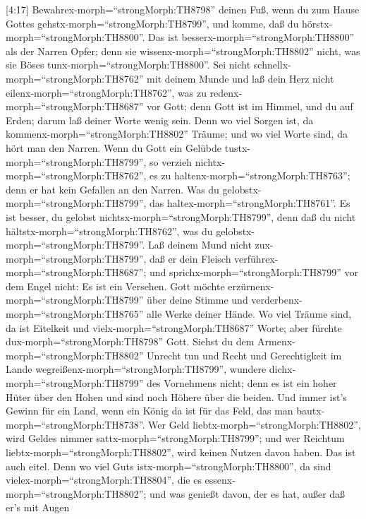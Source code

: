  {[}4:17{]} Bewahrex-morph=``strongMorph:TH8798'' deinen
Fuß, wenn du zum Hause Gottes gehstx-morph=``strongMorph:TH8799'', und
komme, daß du hörstx-morph=``strongMorph:TH8800''. Das ist
besserx-morph=``strongMorph:TH8800'' als der Narren Opfer; denn sie
wissenx-morph=``strongMorph:TH8802'' nicht, was sie Böses
tunx-morph=``strongMorph:TH8800''.  Sei nicht
schnellx-morph=``strongMorph:TH8762'' mit deinem Munde und laß dein Herz
nicht eilenx-morph=``strongMorph:TH8762'', was zu
redenx-morph=``strongMorph:TH8687'' vor Gott; denn Gott ist im Himmel,
und du auf Erden; darum laß deiner Worte wenig sein.  Denn
wo viel Sorgen ist, da kommenx-morph=``strongMorph:TH8802'' Träume; und
wo viel Worte sind, da hört man den Narren.  Wenn du Gott
ein Gelübde tustx-morph=``strongMorph:TH8799'', so verzieh
nichtx-morph=``strongMorph:TH8762'', es zu
haltenx-morph=``strongMorph:TH8763''; denn er hat kein Gefallen an den
Narren. Was du gelobstx-morph=``strongMorph:TH8799'', das
haltex-morph=``strongMorph:TH8761''.  Es ist besser, du
gelobst nichtsx-morph=``strongMorph:TH8799'', denn daß du nicht
hältstx-morph=``strongMorph:TH8762'', was du
gelobstx-morph=``strongMorph:TH8799''.  Laß deinem Mund
nicht zux-morph=``strongMorph:TH8799'', daß er dein Fleisch
verführex-morph=``strongMorph:TH8687''; und
sprichx-morph=``strongMorph:TH8799'' vor dem Engel nicht: Es ist ein
Versehen. Gott möchte erzürnenx-morph=``strongMorph:TH8799'' über deine
Stimme und verderbenx-morph=``strongMorph:TH8765'' alle Werke deiner
Hände.  Wo viel Träume sind, da ist Eitelkeit und
vielx-morph=``strongMorph:TH8687'' Worte; aber fürchte
dux-morph=``strongMorph:TH8798'' Gott.  Siehst du dem
Armenx-morph=``strongMorph:TH8802'' Unrecht tun und Recht und
Gerechtigkeit im Lande wegreißenx-morph=``strongMorph:TH8799'', wundere
dichx-morph=``strongMorph:TH8799'' des Vornehmens nicht; denn es ist ein
hoher Hüter über den Hohen und sind noch Höhere über die beiden.
 Und immer ist's Gewinn für ein Land, wenn ein König da ist
für das Feld, das man bautx-morph=``strongMorph:TH8738''. 
Wer Geld liebtx-morph=``strongMorph:TH8802'', wird Geldes nimmer
sattx-morph=``strongMorph:TH8799''; und wer Reichtum
liebtx-morph=``strongMorph:TH8802'', wird keinen Nutzen davon haben. Das
ist auch eitel.  Denn wo viel Guts
istx-morph=``strongMorph:TH8800'', da sind
vielex-morph=``strongMorph:TH8804'', die es
essenx-morph=``strongMorph:TH8802''; und was genießt davon, der es hat,
außer daß er's mit Augen

